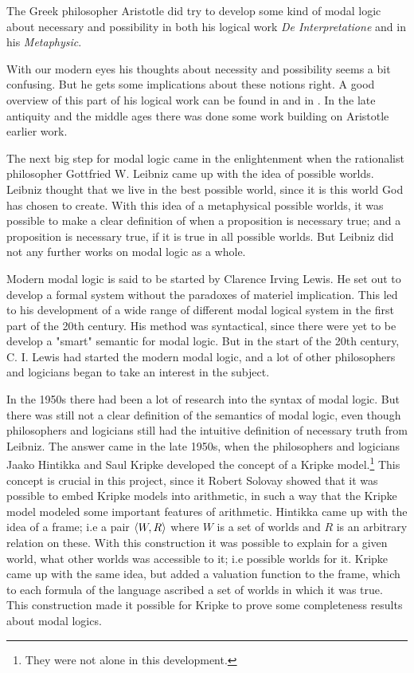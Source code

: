 \documentclass[../main.tex]{subfiles}
\begin{document}
The Greek philosopher Aristotle did try to develop some kind of modal logic
about necessary and possibility in both his logical work \textit{De
Interpretatione} and in his
 \textit{Metaphysic}.

With our modern eyes his thoughts about necessity  and possibility seems a
bit confusing. But he gets some implications about these notions right. A good
overview of this part of his logical work can be found in \parencite{Lemmon1977} and
in \parencite{Luka1957}.
In the late antiquity and the middle ages there was done some work building on 
Aristotle earlier work. 

The next big step for modal logic came in the enlightenment when the
rationalist philosopher Gottfried W. Leibniz came up with the idea of possible
worlds.  Leibniz thought that we live in the best possible world, since it is
this world God has chosen to create. With this idea of a metaphysical possible
worlds, it was possible to make a clear definition of when a proposition is
necessary true; and a proposition is necessary true, if it is true in all
possible worlds. But Leibniz did not any further works on modal logic as a
whole.

Modern modal logic is said to be started by Clarence Irving Lewis. He set out
to develop a formal system without the paradoxes of materiel
implication. This led to his development of a wide range of different modal
logical system in the first part of the 20th century. His method was
syntactical, since there were yet to be develop a "smart" semantic for modal
logic. But in the start of the 20th century, C. I. Lewis had started the modern
modal logic, and a lot of other philosophers and logicians began to take an
interest in the subject.


In the 1950s there had been a lot of research into the syntax of modal logic.
But there was still not a clear definition of the semantics of modal logic,
even though philosophers and logicians still had the intuitive definition of
necessary truth from Leibniz. The answer came in the late 1950s, when the
philosophers and logicians Jaako Hintikka
and Saul Kripke developed the concept of a Kripke model.\footnote{They were not
	alone in this development.} This concept is crucial in this project,
since it Robert Solovay showed that it was possible to embed Kripke models into
arithmetic, in such a way that the Kripke model modeled some important features
of arithmetic.
Hintikka came up with the idea of a frame; i.e a pair $\langle W,R\rangle$ where $W$ is
a set of worlds and $R$ is an arbitrary relation on these. With this
construction it was possible to explain for a given world, what other worlds
was accessible to it; i.e possible worlds for it. Kripke came up with the same
idea, but added a valuation function to the frame, which to each formula of the
language ascribed a set of worlds in which it was true.  This construction made
it possible for Kripke to prove some completeness results about modal logics.
\end{document}
